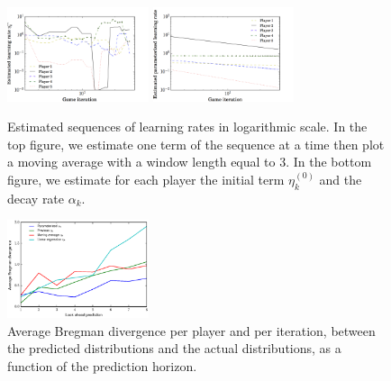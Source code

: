 \documentclass{sig-alternate-ipsn13}
\begin{document}
\begin{figure}[h!]
  \centering
  \includegraphics[width=0.37\textwidth]{images/moving_average_learning_rate}
  \includegraphics[width=0.37\textwidth]{images/sequence_rate}
  \caption{\footnotesize Estimated sequences of learning rates in logarithmic scale. In the top figure, we estimate one term of the sequence at a time then plot a moving average with a window length equal to $3$. In the bottom figure, we estimate for each player the initial term $\eta^{(0)}_k$ and the decay rate $\alpha_k$.}
  \label{fig:moving_average_learning_rate}
  \label{fig:sequence_rate}
\end{figure}



\begin{figure}[h]
  \centering
  \includegraphics[width=0.37\textwidth]{images/predictions_divergence}
  \caption{\footnotesize Average Bregman divergence per player and per iteration, between the predicted distributions and the actual distributions, as a function of the prediction horizon.}
  \label{fig:predictions_divergence}
\end{figure}
\end{document}
